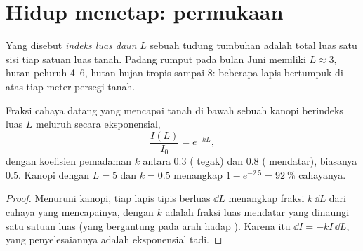 \section{Hidup menetap: permukaan}

\begin{definition}\label{def:b1:flowering-plant-organization:lai}
Yang disebut \emph{indeks luas daun} $L$ sebuah
tudung tumbuhan adalah total luas  satu sisi tiap satuan luas tanah.
Padang rumput pada bulan Juni memiliki $L \approx 3$, hutan peluruh
\qtyrange{4}{6}{}, hutan hujan tropis sampai \qty{8}{}: beberapa lapis
 bertumpuk di atas tiap meter persegi tanah.
\end{definition}

\begin{proposition}\label{prop:b1:flowering-plant-organization:beer}
Fraksi cahaya datang yang mencapai tanah di bawah sebuah kanopi
berindeks luas  $L$ meluruh secara eksponensial,
\[
\frac{I(L)}{I_0} = e^{-kL},
\]
dengan koefisien pemadaman $k$ antara $0.3$ ( tegak) dan $0.8$
( mendatar), biasanya $0.5$. Kanopi dengan $L = 5$ dan $k = 0.5$
menangkap $1 - e^{-2.5} = \qty{92}{\%}$ cahayanya.
\end{proposition}
\begin{proof}
Menuruni kanopi, tiap lapis tipis berluas  $\dd L$ menangkap fraksi
$k\,\dd L$ dari cahaya yang mencapainya, dengan $k$ adalah fraksi luas
mendatar yang dinaungi satu satuan luas  (yang bergantung pada arah
hadap ). Karena itu $\dd I = -kI\,\dd L$, yang penyelesaiannya
adalah eksponensial tadi.
\end{proof}

